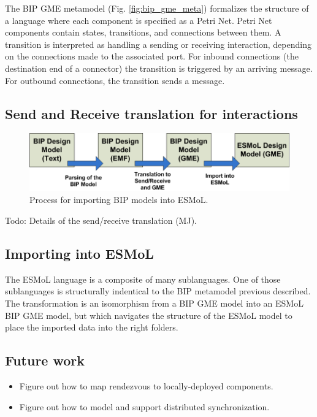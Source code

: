 The BIP GME metamodel (Fig. \ref{fig:bip_gme_meta}) formalizes the structure of a language where each component is specified as a Petri Net.  Petri Net components contain states, transitions, and connections between them. A transition is interpreted as handling a sending or receiving interaction, depending on the connections made to the associated port.  For inbound connections (the destination end of a connector) the transition is triggered by an arriving message.  For outbound connections, the transition sends a message.  

\subsection{Send and Receive translation for interactions}

\begin{figure}[htb]
	\centering
		\includegraphics[width=1.00\textwidth]{figures/bip_import.png}
	\caption{Process for importing BIP models into ESMoL.}
	\label{fig:bip_import}
\end{figure}


Todo: Details of the send/receive translation (MJ).

\subsection{Importing into ESMoL}

The ESMoL language is a composite of many sublanguages.  One of those sublanguages is structurally indentical to the BIP metamodel previous described.  The transformation is an isomorphism from a BIP GME model into an ESMoL BIP GME model, but which navigates the structure of the ESMoL model to place the imported data into the right folders.

\subsection{Future work}

\begin{itemize}
\item Figure out how to map rendezvous to locally-deployed components.
\item Figure out how to model and support distributed synchronization.
\end{itemize}
